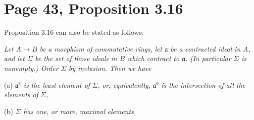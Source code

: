 \documentclass[12pt]{article}
\newcommand{\oo}{\operatorname}
\newcommand{\mf}{\mathfrak}
\newcommand{\aaa}{\mf a}
\begin{document}
\begin{comment}
Here are some additional details. Let us summarize the setting by the commutative diagram
$$
\begin{tikzcd}
A\ar[d,"\alpha"']\ar[r,"f"]&B\ar[d,"\beta"]\\ 
A_{\mf p}\ar[r,"f_{\mf p}"']&B_{\mf p}.
\end{tikzcd}
$$ 
\emph{We have:}

(a) \emph{If $\mf p$ is not contracted, that is $f^{-1}(\mf pB)>\mf p$, then} $\mf pB_{\mf p}=B_{\mf p}$, that is $B\otimes_AA_{\mf p}/\mf p_{\mf p}=0$.

(b) \emph{Assume $\mf p$ is contracted, that is $f^{-1}(\mf pB)=\mf p$, and let $\mf m$ be a maximal ideal of $B_{\mf p}$ containing $\mf pB_{\mf p}$. Then we have $f^{-1}\beta^{-1}\mf m=\mf p$ and} $B\otimes_AA_{\mf p}/\mf p_{\mf p}\simeq B_{\mf p}/\mf pB_{\mf p}\ne0$.

(c) \emph{The prime ideal $\mf p$ is contracted if and only if} $B\otimes_AA_{\mf p}/\mf p_{\mf p}\ne0$. \emph{In particular, a maximal ideal $\mf m$ in $A$ is contracted if and only if $B\otimes_AA/\mf m\ne0$. (Compare with Section~\ref{27} p.~\pageref{27}.)}

Proof: (a) is clear. To prove (b), note that we have $\mf pB_{\mf p}\subset\mf m$. This implies successively 
$$
\mf p_{\mf p}\subset(f_{\mf p})^{-1}\mf m,
$$ 
$$
\mf p_{\mf p}=(f_{\mf p})^{-1}\mf m,
$$ 
$$
f^{-1}\beta^{-1}\mf m=\alpha^{-1}(f_{\mf p})^{-1}\mf m=\alpha^{-1}\mf p_{\mf p}=\mf p.
$$ 
\end{comment}


\section{Page 43, Proposition 3.16}\label{43}%

Proposition 3.16 can also be stated as follows:

\emph{Let $A\to B$ be a morphism of commutative rings, let $\aaa$ be a contracted ideal in $A$, and let $\Sigma$ be the set of those ideals in $B$ which contract to $\aaa$. (In particular $\Sigma$ is nonempty.) Order $\Sigma$ by inclusion. Then we have}

(a) \emph{$\aaa^{\oo e}$ is the least element of $\Sigma$, or, equivalently, $\aaa^{\oo e}$ is the intersection of all the elements of $\Sigma$,}

(b) \emph{$\Sigma$ has one, or more, maximal elements,}
\end{document}
